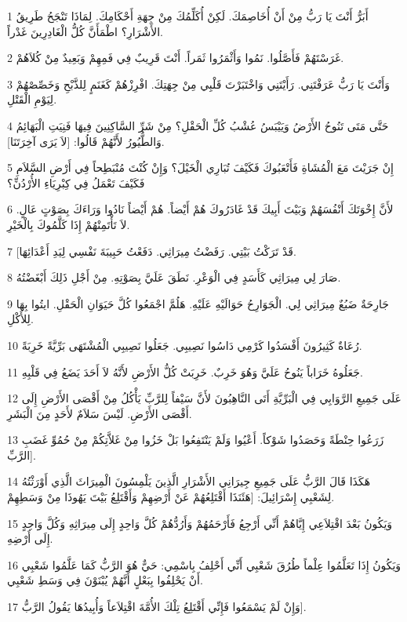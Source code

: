 \par 1 أَبَرُّ أَنْتَ يَا رَبُّ مِنْ أَنْ أُخَاصِمَكَ. لَكِنْ أُكَلِّمُكَ مِنْ جِهَةِ أَحْكَامِكَ. لِمَاذَا تَنْجَحُ طَرِيقُ الأَشْرَارِ؟ اطْمَأَنَّ كُلُّ الْغَادِرِينَ غَدْراً.
\par 2 غَرَسْتَهُمْ فَأَصَّلُوا. نَمُوا وَأَثْمَرُوا ثَمَراً. أَنْتَ قَرِيبٌ فِي فَمِهِمْ وَبَعِيدٌ مِنْ كُلاَهُمْ.
\par 3 وَأَنْتَ يَا رَبُّ عَرَفْتَنِي. رَأَيْتَنِي وَاخْتَبَرْتَ قَلْبِي مِنْ جِهَتِكَ. افْرِزْهُمْ كَغَنَمٍ لِلذَّبْحِ وَخَصِّصْهُمْ لِيَوْمِ الْقَتْلِ.
\par 4 حَتَّى مَتَى تَنُوحُ الأَرْضُ وَيَيْبَسُ عُشْبُ كُلِّ الْحَقْلِ؟ مِنْ شَرِّ السَّاكِنِينَ فِيهَا فَنِيَتِ الْبَهَائِمُ وَالطُّيُورُ لأَنَّهُمْ قَالُوا: [لاَ يَرَى آخِرَتَنَا].
\par 5 إِنْ جَرَيْتَ مَعَ الْمُشَاةِ فَأَتْعَبُوكَ فَكَيْفَ تُبَارِي الْخَيْلَ؟ وَإِنْ كُنْتَ مُنْبَطِحاً فِي أَرْضِ السَّلاَمِ فَكَيْفَ تَعْمَلُ فِي كِبْرِيَاءِ الأُرْدُنِّ؟
\par 6 لأَنَّ إِخْوَتَكَ أَنْفُسَهُمْ وَبَيْتَ أَبِيكَ قَدْ غَادَرُوكَ هُمْ أَيْضاً. هُمْ أَيْضاً نَادُوا وَرَاءَكَ بِصَوْتٍ عَالٍ. لاَ تَأْتَمِنْهُمْ إِذَا كَلَّمُوكَ بِالْخَيْرِ.
\par 7 [قَدْ تَرَكْتُ بَيْتِي. رَفَضْتُ مِيرَاثِي. دَفَعْتُ حَبِيبَةَ نَفْسِي لِيَدِ أَعْدَائِهَا.
\par 8 صَارَ لِي مِيرَاثِي كَأَسَدٍ فِي الْوَعْرِ. نَطَقَ عَلَيَّ بِصَوْتِهِ. مِنْ أَجْلِ ذَلِكَ أَبْغَضْتُهُ.
\par 9 جَارِحَةٌ ضَبُعٌ مِيرَاثِي لِي. الْجَوَارِحُ حَوَالَيْهِ عَلَيْهِ. هَلُمَّ اجْمَعُوا كُلَّ حَيَوَانِ الْحَقْلِ. ايتُوا بِهَا لِلأَكْلِ.
\par 10 رُعَاةٌ كَثِيرُونَ أَفْسَدُوا كَرْمِي دَاسُوا نَصِيبِي. جَعَلُوا نَصِيبِي الْمُشْتَهَى بَرِّيَّةً خَرِبَةً.
\par 11 جَعَلُوهُ خَرَاباً يَنُوحُ عَلَيَّ وَهُوَ خَرِبٌ. خَرِبَتْ كُلُّ الأَرْضِ لأَنَّهُ لاَ أَحَدَ يَضَعُ فِي قَلْبِهِ.
\par 12 عَلَى جَمِيعِ الرَّوَابِي فِي الْبَرِّيَّةِ أَتَى النَّاهِبُونَ لأَنَّ سَيْفاً لِلرَّبِّ يَأْكُلُ مِنْ أَقْصَى الأَرْضِ إِلَى أَقْصَى الأَرْضِ. لَيْسَ سَلاَمٌ لأَحَدٍ مِنَ الْبَشَرِ.
\par 13 زَرَعُوا حِنْطَةً وَحَصَدُوا شَوْكاً. أَعْيُوا وَلَمْ يَنْتَفِعُوا بَلْ خَزُوا مِنْ غَلاَّتِكُمْ مِنْ حُمُوِّ غَضَبِ الرَّبِّ].
\par 14 هَكَذَا قَالَ الرَّبُّ عَلَى جَمِيعِ جِيرَانِي الأَشْرَارِ الَّذِينَ يَلْمِسُونَ الْمِيرَاثَ الَّذِي أَوْرَثْتُهُ لِشَعْبِي إِسْرَائِيلَ: [هَئَنَذَا أَقْتَلِعُهُمْ عَنْ أَرْضِهِمْ وَأَقْتَلِعُ بَيْتَ يَهُوذَا مِنْ وَسَطِهِمْ.
\par 15 وَيَكُونُ بَعْدَ اقْتِلاَعِي إِيَّاهُمْ أَنِّي أَرْجِعُ فَأَرْحَمُهُمْ وَأَرُدُّهُمْ كُلَّ وَاحِدٍ إِلَى مِيرَاثِهِ وَكُلَّ وَاحِدٍ إِلَى أَرْضِهِ.
\par 16 وَيَكُونُ إِذَا تَعَلَّمُوا عِلْماً طُرُقَ شَعْبِي أَنِّي أَحْلِفُ بِاسْمِي: حَيٌّ هُوَ الرَّبُّ كَمَا عَلَّمُوا شَعْبِي أَنْ يَحْلِفُوا بِبَعْلٍ أَنَّهُمْ يُبْنَوْنَ فِي وَسَطِ شَعْبِي.
\par 17 وَإِنْ لَمْ يَسْمَعُوا فَإِنِّي أَقْتَلِعُ تِلْكَ الأُمَّةَ اقْتِلاَعاً وَأُبِيدُهَا يَقُولُ الرَّبُّ].

